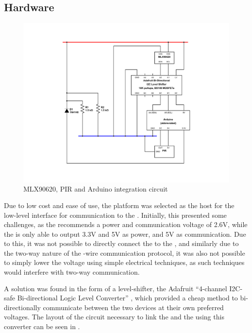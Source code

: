\documentclass[../thesis/thesis.tex]{subfiles}
\begin{document}
\subsection{Hardware}
 
\begin{figure}
\centering
\includegraphics[width=\textwidth]{../diagrams/mlx-arduino.pdf}
\caption{MLX90620, PIR and Arduino integration circuit}
\label{fig:circuits:node}
\end{figure}

Due to low cost and ease of use, the \ard platform was selected as the host for the low-level \iic interface for communication to the \mlx. Initially, this presented some challenges, as the \mlx recommends a power and communication voltage of 2.6V, while the \ard is only able to output 3.3V and 5V as power, and 5V as communication. Due to this, it was not possible to directly connect the \ard to the \mlx, and similarly due to the two-way nature of the -wire communication protocol, it was also not possible to simply lower the \ard voltage using simple electrical techniques, as such techniques would interfere with two-way communication.

A solution was found in the form of a \iic level-shifter, the Adafruit ``4-channel I2C-safe Bi-directional Logic Level Converter'' \cite{AdafruitI2C}, which provided a cheap method to bi-directionally communicate between the two devices at their own preferred voltages. The layout of the circuit necessary to link the \ard and the \mlx using this converter can be seen in .
\end{document}
